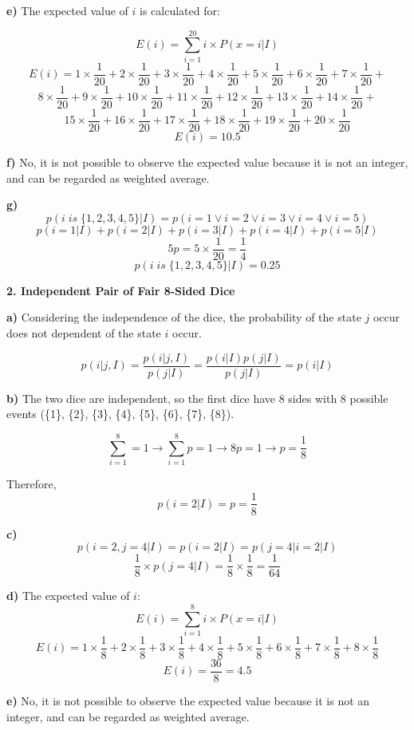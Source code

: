 \documentclass[a4paper, 12pt]{article}
\begin{document}
\begin{flushleft}
\textbf{e)} The expected value of $i$ is calculated for:

$$ E(i) = \displaystyle\sum_{i=1}^{20} i \times P(x=i|I) $$
$$ E(i) = 1 \times \frac{1}{20} + 2 \times \frac{1}{20} + 3 \times \frac{1}{20} + 4 \times \frac{1}{20} + 5 \times \frac{1}{20} + 6 \times \frac{1}{20} + 7 \times \frac{1}{20} + $$
$$ 8 \times \frac{1}{20} + 9 \times \frac{1}{20} + 10 \times \frac{1}{20} + 11 \times \frac{1}{20} + 12 \times \frac{1}{20} + 13 \times \frac{1}{20} + 14 \times \frac{1}{20} + $$
$$  15 \times \frac{1}{20} + 16 \times \frac{1}{20} + 17 \times \frac{1}{20} + 18 \times \frac{1}{20} + 19 \times \frac{1}{20} + 20 \times \frac{1}{20} $$
$$ E(i) = 10.5 $$

\textbf{f)} No, it is not possible to observe the expected value because it is not an integer, and can be regarded as weighted average.

\textbf{g)} 
$$ p(i \; is \; \{1,2,3,4,5\}|I) = p(i=1 \vee i=2 \vee i=3 \vee i=4 \vee i=5) $$
$$ p(i=1|I) + p(i=2|I) + p(i=3|I) + p(i=4|I) + p(i=5|I) $$
$$ 5p = 5 \times \frac{1}{20} = \frac{1}{4} $$
$$ p(i \; is \; \{1,2,3,4,5\}|I) = 0.25 $$


\textbf{2. Independent Pair of Fair 8-Sided Dice}

\textbf{a)} Considering the independence of the dice, the probability of the state $j$ occur does not dependent of the state $i$ occur.

$$ p(i|j,I) = \frac{p(i|j,I)}{p(j|I)} = \frac{p(i|I)p(j|I)}{p(j|I)} = p(i|I)$$

\textbf{b)} The two dice are independent, so the first dice have 8 sides with 8 possible events (\{1\}, \{2\}, \{3\}, \{4\}, \{5\}, \{6\}, \{7\}, \{8\}).

$$ \displaystyle\sum_{i=1}^{8} =1 \rightarrow \displaystyle\sum_{i=1}^{8}p=1 \rightarrow 8p=1 \rightarrow p=\frac{1}{8} $$

Therefore,
$$ p(i=2|I) = p = \frac{1}{8}$$

\textbf{c)} 
$$ p(i=2, j=4|I) = p(i=2|I) = p(j=4|i=2|I) $$
$$ \frac{1}{8} \times p(j=4|I) = \frac{1}{8} \times \frac{1}{8} = \frac{1}{64} $$

\textbf{d)} The expected value of $i$:
$$ E(i) = \displaystyle\sum_{i=1}^{8} i \times P(x=i|I) $$
$$ E(i) = 1 \times \frac{1}{8} + 2 \times \frac{1}{8} + 3 \times \frac{1}{8} + 4 \times \frac{1}{8} + 5 \times \frac{1}{8} + 6 \times \frac{1}{8}+ 7 \times \frac{1}{8} + 8 \times \frac{1}{8}$$
$$ E(i) = \frac{36}{8} = 4.5 $$

\textbf{e)} No, it is not possible to observe the expected value because it is not an integer, and can be regarded as weighted average.


\end{flushleft}
\end{document}
